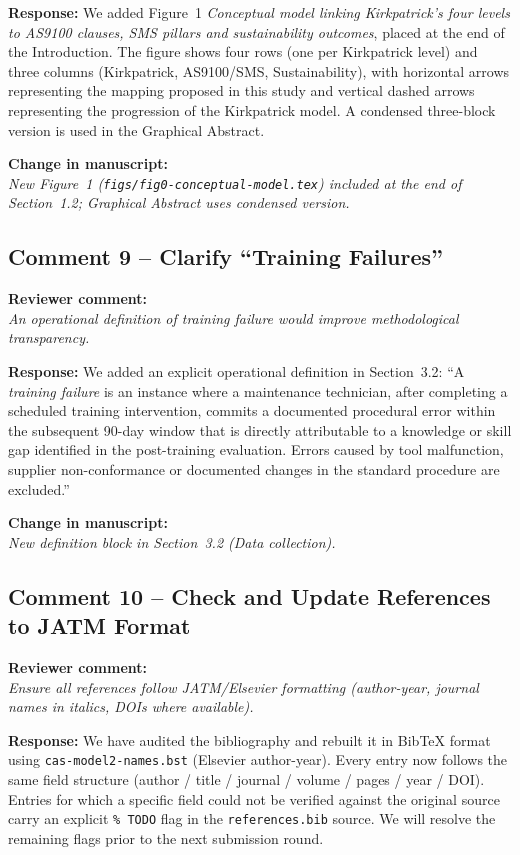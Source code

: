 \documentclass[11pt,a4paper]{article}
\newcommand{\comment}[1]{\par\smallskip\noindent\textbf{\color{blue!60!black}Reviewer comment:}\\ \emph{#1}\par\smallskip}
\newcommand{\response}[1]{\noindent\textbf{Response:} #1\par\smallskip}
\newcommand{\change}[1]{\par\noindent\textbf{\color{green!50!black}Change in manuscript:}\\ \emph{#1}\par\smallskip}
\begin{document}
\response{We added Figure~1 \emph{Conceptual model linking Kirkpatrick's
four levels to AS9100 clauses, SMS pillars and sustainability outcomes},
placed at the end of the Introduction. The figure shows four rows (one per
Kirkpatrick level) and three columns (Kirkpatrick, AS9100/SMS,
Sustainability), with horizontal arrows representing the mapping proposed
in this study and vertical dashed arrows representing the progression of
the Kirkpatrick model. A condensed three-block version is used in the
Graphical Abstract.}

\change{New Figure~1 (\texttt{figs/fig0-conceptual-model.tex}) included at
the end of Section~1.2; Graphical Abstract uses condensed version.}

\subsection*{Comment 9 -- Clarify ``Training Failures''}
\comment{An operational definition of \emph{training failure} would improve
methodological transparency.}

\response{We added an explicit operational definition in
Section~3.2: ``A \emph{training failure} is an instance where a maintenance
technician, after completing a scheduled training intervention, commits a
documented procedural error within the subsequent 90-day window that is
directly attributable to a knowledge or skill gap identified in the
post-training evaluation. Errors caused by tool malfunction, supplier
non-conformance or documented changes in the standard procedure are
excluded.''}

\change{New definition block in Section~3.2 (Data collection).}

\subsection*{Comment 10 -- Check and Update References to JATM Format}
\comment{Ensure all references follow JATM/Elsevier formatting (author-year,
journal names in italics, DOIs where available).}

\response{We have audited the bibliography and rebuilt it in BibTeX format
using \texttt{cas-model2-names.bst} (Elsevier author-year). Every entry now
follows the same field structure (author / title / journal / volume /
pages / year / DOI). Entries for which a specific field could not be
verified against the original source carry an explicit \texttt{\% TODO}
flag in the \texttt{references.bib} source. We will resolve the remaining
flags prior to the next submission round.}
\end{document}
